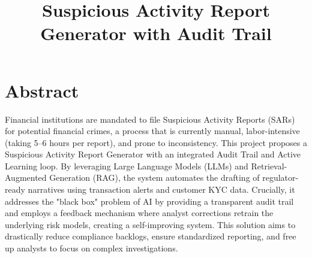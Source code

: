 \documentclass{article}
\title{Suspicious Activity Report Generator with Audit Trail}
\author{}
\date{}
\begin{document}
\maketitle

\section{Abstract}
Financial institutions are mandated to file Suspicious Activity Reports (SARs) for potential financial crimes, a process that is currently manual, labor-intensive (taking 5–6 hours per report), and prone to inconsistency. This project proposes a Suspicious Activity Report Generator with an integrated Audit Trail and Active Learning loop. By leveraging Large Language Models (LLMs) and Retrieval-Augmented Generation (RAG), the system automates the drafting of regulator-ready narratives using transaction alerts and customer KYC data. Crucially, it addresses the "black box" problem of AI by providing a transparent audit trail and employs a feedback mechanism where analyst corrections retrain the underlying risk models, creating a self-improving system. This solution aims to drastically reduce compliance backlogs, ensure standardized reporting, and free up analysts to focus on complex investigations.
\end{document}
